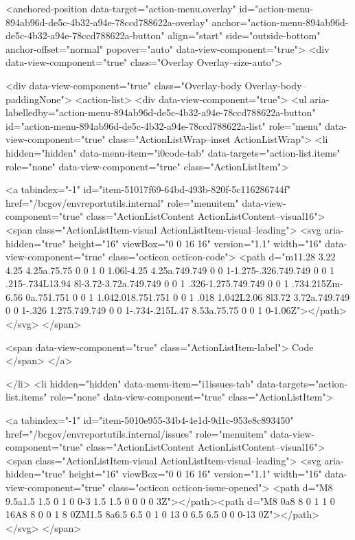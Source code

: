 <anchored-position data-target="action-menu.overlay" id="action-menu-894ab96d-de5c-4b32-a94e-78ccd788622a-overlay" anchor="action-menu-894ab96d-de5c-4b32-a94e-78ccd788622a-button" align="start" side="outside-bottom" anchor-offset="normal" popover="auto" data-view-component="true">
  <div data-view-component="true" class="Overlay Overlay--size-auto">
    
      <div data-view-component="true" class="Overlay-body Overlay-body--paddingNone">          <action-list>
  <div data-view-component="true">
    <ul aria-labelledby="action-menu-894ab96d-de5c-4b32-a94e-78ccd788622a-button" id="action-menu-894ab96d-de5c-4b32-a94e-78ccd788622a-list" role="menu" data-view-component="true" class="ActionListWrap--inset ActionListWrap">
        <li hidden="hidden" data-menu-item="i0code-tab" data-targets="action-list.items" role="none" data-view-component="true" class="ActionListItem">
    
    
    <a tabindex="-1" id="item-51017f69-64bd-493b-820f-5c116286744f" href="/bcgov/envreportutils.internal" role="menuitem" data-view-component="true" class="ActionListContent ActionListContent--visual16">
        <span class="ActionListItem-visual ActionListItem-visual--leading">
          <svg aria-hidden="true" height="16" viewBox="0 0 16 16" version="1.1" width="16" data-view-component="true" class="octicon octicon-code">
    <path d="m11.28 3.22 4.25 4.25a.75.75 0 0 1 0 1.06l-4.25 4.25a.749.749 0 0 1-1.275-.326.749.749 0 0 1 .215-.734L13.94 8l-3.72-3.72a.749.749 0 0 1 .326-1.275.749.749 0 0 1 .734.215Zm-6.56 0a.751.751 0 0 1 1.042.018.751.751 0 0 1 .018 1.042L2.06 8l3.72 3.72a.749.749 0 0 1-.326 1.275.749.749 0 0 1-.734-.215L.47 8.53a.75.75 0 0 1 0-1.06Z"></path>
</svg>
        </span>
      
        <span data-view-component="true" class="ActionListItem-label">
          Code
</span>      
</a>
  
</li>
        <li hidden="hidden" data-menu-item="i1issues-tab" data-targets="action-list.items" role="none" data-view-component="true" class="ActionListItem">
    
    
    <a tabindex="-1" id="item-5010e955-34b4-4e1d-9d1c-953e8c893450" href="/bcgov/envreportutils.internal/issues" role="menuitem" data-view-component="true" class="ActionListContent ActionListContent--visual16">
        <span class="ActionListItem-visual ActionListItem-visual--leading">
          <svg aria-hidden="true" height="16" viewBox="0 0 16 16" version="1.1" width="16" data-view-component="true" class="octicon octicon-issue-opened">
    <path d="M8 9.5a1.5 1.5 0 1 0 0-3 1.5 1.5 0 0 0 0 3Z"></path><path d="M8 0a8 8 0 1 1 0 16A8 8 0 0 1 8 0ZM1.5 8a6.5 6.5 0 1 0 13 0 6.5 6.5 0 0 0-13 0Z"></path>
</svg>
        </span>
      
